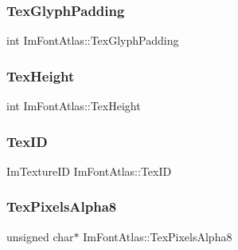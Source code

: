 \hypertarget{struct_im_font_atlas_a32034b2aac4616d8c27ee666a1fd1b62}{}\label{struct_im_font_atlas_a32034b2aac4616d8c27ee666a1fd1b62} 
\subsubsection{\texorpdfstring{Tex\+Glyph\+Padding}{TexGlyphPadding}}
{\footnotesize\ttfamily int Im\+Font\+Atlas\+::\+Tex\+Glyph\+Padding}

\hypertarget{struct_im_font_atlas_a5ef74d37ec01d9e8aac5c57433296ce3}{}\label{struct_im_font_atlas_a5ef74d37ec01d9e8aac5c57433296ce3} 
\subsubsection{\texorpdfstring{Tex\+Height}{TexHeight}}
{\footnotesize\ttfamily int Im\+Font\+Atlas\+::\+Tex\+Height}

\hypertarget{struct_im_font_atlas_a1d7be9a6190c75706f80bda16c87f28e}{}\label{struct_im_font_atlas_a1d7be9a6190c75706f80bda16c87f28e} 
\subsubsection{\texorpdfstring{Tex\+ID}{TexID}}
{\footnotesize\ttfamily Im\+Texture\+ID Im\+Font\+Atlas\+::\+Tex\+ID}

\hypertarget{struct_im_font_atlas_a443ea9e7c4cf85ee791ffe891280eff3}{}\label{struct_im_font_atlas_a443ea9e7c4cf85ee791ffe891280eff3} 
\subsubsection{\texorpdfstring{Tex\+Pixels\+Alpha8}{TexPixelsAlpha8}}
{\footnotesize\ttfamily unsigned char$\ast$ Im\+Font\+Atlas\+::\+Tex\+Pixels\+Alpha8}

\hypertarget{struct_im_font_atlas_a41163489a5b8060f405c56e22590cba5}{}\label{struct_im_font_atlas_a41163489a5b8060f405c56e22590cba5} 
